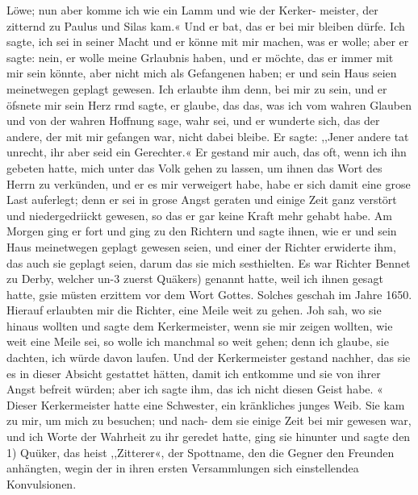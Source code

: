 Löwe; nun aber komme ich wie ein Lamm und wie der Kerker-
meister, der zitternd zu Paulus und Silas kam.« Und er bat,
das er bei mir bleiben dürfe. Ich sagte, ich sei in seiner Macht
und er könne mit mir machen, was er wolle; aber er sagte:
nein, er wolle meine Grlaubnis haben, und er möchte, das er
immer mit mir sein könnte, aber nicht mich als Gefangenen haben;
er und sein Haus seien meinetwegen geplagt gewesen. Ich erlaubte
ihm denn, bei mir zu sein, und er öfsnete mir sein Herz rmd
sagte, er glaube, das das, was ich vom wahren Glauben und
von der wahren Hoffnung sage, wahr sei, und er wunderte sich,
das der andere, der mit mir gefangen war, nicht dabei bleibe.
Er sagte: ,,Jener andere tat unrecht, ihr aber seid ein Gerechter.«
Er gestand mir auch, das oft, wenn ich ihn gebeten hatte, mich
unter das Volk gehen zu lassen, um ihnen das Wort des Herrn
zu verkünden, und er es mir verweigert habe, habe er sich damit
eine grose Last auferlegt; denn er sei in grose Angst geraten
und einige Zeit ganz verstört und niedergedriickt gewesen, so das
er gar keine Kraft mehr gehabt habe. Am Morgen ging er fort
und ging zu den Richtern und sagte ihnen, wie er und sein Haus
meinetwegen geplagt gewesen seien, und einer der Richter erwiderte
ihm, das auch sie geplagt seien, darum das sie mich sesthielten.
Es war Richter Bennet zu Derby, welcher un-3 zuerst Quäkers)
genannt hatte, weil ich ihnen gesagt hatte, gsie müsten erzittem
vor dem Wort Gottes. Solches geschah im Jahre 1650.
Hierauf erlaubten mir die Richter, eine Meile weit zu gehen.
Joh sah, wo sie hinaus wollten und sagte dem Kerkermeister,
wenn sie mir zeigen wollten, wie weit eine Meile sei, so wolle
ich manchmal so weit gehen; denn ich glaube, sie dachten, ich
würde davon laufen. Und der Kerkermeister gestand nachher,
das sie es in dieser Absicht gestattet hätten, damit ich entkomme
und sie von ihrer Angst befreit würden; aber ich sagte ihm, das
ich nicht diesen Geist habe. «
Dieser Kerkermeister hatte eine Schwester, ein kränkliches
junges Weib. Sie kam zu mir, um mich zu besuchen; und nach-
dem sie einige Zeit bei mir gewesen war, und ich Worte der
Wahrheit zu ihr geredet hatte, ging sie hinunter und sagte den
1) Quüker, das heist ,,Zitterer«, der Spottname, den die Gegner den
Freunden anhängten, wegin der in ihren ersten Versammlungen sich einstellendea
Konvulsionen.


